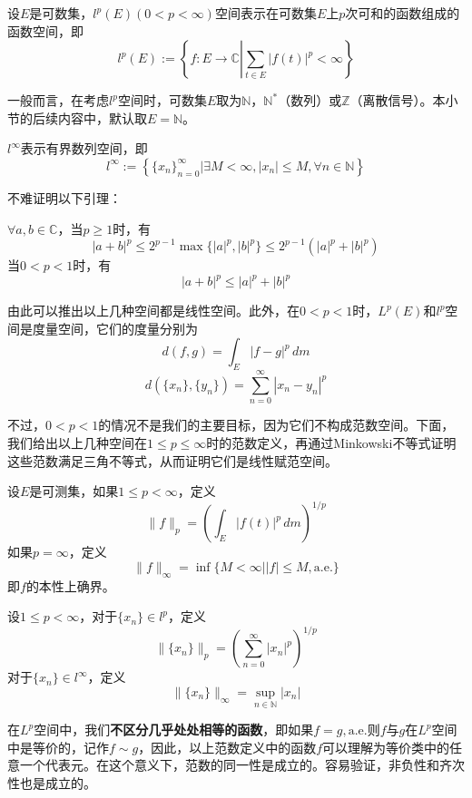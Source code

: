 \begin{definition}[$l^p$空间]
    设$E$是可数集，$l^p(E)(0<p<\infty)$空间表示在可数集$E$上$p$次可和的函数组成的函数空间，即
    \[l^p(E):=\left\{f:E\rightarrow \mathbb{C} \left| \sum_{t\in E}|f(t)|^p<\infty\right.\right\}\]
\end{definition}

一般而言，在考虑$l^p$空间时，可数集$E$取为$\mathbb{N}$，$\mathbb{N} ^*$（数列）或$\mathbb{Z}$（离散信号）。本小节的后续内容中，默认取$E=\mathbb{N}$。

\begin{definition}[$l^{\infty}$空间]
    $l^{\infty}$表示有界数列空间，即
    \[l^{\infty}:=\left\{\{x_n\}_{n=0}^{\infty} \left|\exists M<\infty,|x_n|\leq M,\forall n\in \mathbb{N}\right.\right\}\]
\end{definition}

不难证明以下引理：
\begin{lemma}
    $\forall a,b\in\mathbb{C}$，当$p\geq 1$时，有
    \[|a+b|^p\leq 2^{p-1}\max\{|a|^p,|b|^p\}\leq 2^{p-1}(|a|^p+|b|^p)\]
    当$0<p<1$时，有
    \[|a+b|^p\leq |a|^p+|b|^p\]
\end{lemma}

由此可以推出以上几种空间都是线性空间。此外，在$0<p<1$时，$L^p(E)$和$l^p$空间是度量空间，它们的度量分别为
\[d(f,g)=\int_{E}|f-g|^p\,dm\]
\[d(\{x_n\},\{y_n\})=\sum_{n=0}^{\infty}|x_n-y_n|^p\]

不过，$0<p<1$的情况不是我们的主要目标，因为它们不构成范数空间。下面，我们给出以上几种空间在$1\leq p \leq \infty$时的范数定义，再通过Minkowski不等式证明这些范数满足三角不等式，从而证明它们是线性赋范空间。

\begin{definition}[$L^p$空间的范数]
    设$E$是可测集，如果$1\leq p<\infty$，定义
    \[\|f\|_p=\left(\int_{E}|f(t)|^p\,dm\right)^{1/p}\]
    如果$p=\infty$，定义
    \[\|f\|_{\infty}=\inf\{M<\infty||f|\leq M,\text{a.e.}\}\]
    即$f$的本性上确界。
\end{definition}

\begin{definition}[$l^p$空间的范数]
    设$1\leq p<\infty$，对于$\{x_n\}\in l^p$，定义
    \[\|\{x_n\}\|_p=\left(\sum_{n=0}^{\infty}|x_n|^p\right)^{1/p}\]
    对于$\{x_n\}\in l^{\infty}$，定义
    \[\|\{x_n\}\|_{\infty}=\sup_{n\in \mathbb{N}}|x_n|\]
\end{definition}

在$L^p$空间中，我们\textbf{不区分几乎处处相等的函数}，即如果$f=g,\text{a.e.}$则$f$与$g$在$L^p$空间中是等价的，记作$f\sim g$，因此，以上范数定义中的函数$f$可以理解为等价类中的任意一个代表元。在这个意义下，范数的同一性是成立的。容易验证，非负性和齐次性也是成立的。

